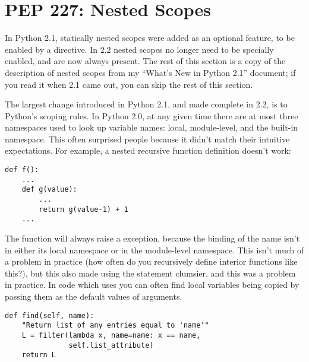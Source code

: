 \documentclass{howto}
\begin{document}
\begin{seealso}


\end{seealso}


\section{PEP 227: Nested Scopes}

In Python 2.1, statically nested scopes were added as an optional
feature, to be enabled by a  directive.  In 2.2 nested scopes no longer need to be
specially enabled, and are now always present.  The rest of this section
is a copy of the description of nested scopes from my ``What's New in
Python 2.1'' document; if you read it when 2.1 came out, you can skip
the rest of this section.

The largest change introduced in Python 2.1, and made complete in 2.2,
is to Python's scoping rules.  In Python 2.0, at any given time there
are at most three namespaces used to look up variable names: local,
module-level, and the built-in namespace.  This often surprised people
because it didn't match their intuitive expectations.  For example, a
nested recursive function definition doesn't work:

\begin{verbatim}
def f():
    ...
    def g(value):
        ...
        return g(value-1) + 1
    ...
\end{verbatim}

The function  will always raise a 
exception, because the binding of the name  isn't in either
its local namespace or in the module-level namespace.  This isn't much
of a problem in practice (how often do you recursively define interior
functions like this?), but this also made using the 
statement clumsier, and this was a problem in practice.  In code which
uses  you can often find local variables being copied
by passing them as the default values of arguments.

\begin{verbatim}
def find(self, name):
    "Return list of any entries equal to 'name'"
    L = filter(lambda x, name=name: x == name,
               self.list_attribute)
    return L
\end{verbatim}
\end{document}
